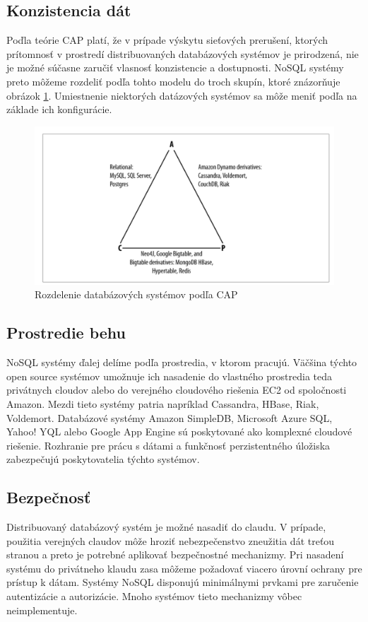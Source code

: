 \documentclass[11pt,twoside,a4paper]{book}
\begin{document}
\subsection{Konzistencia dát}
Poďla teórie CAP platí, že v prípade výskytu sieťových prerušení, ktorých prítomnosť v prostredí distribuovaných databázových systémov je prirodzená, nie je možné súčasne zaručiť vlasnosť konzistencie a dostupnosti. NoSQL systémy preto môžeme rozdeliť podľa tohto modelu do troch skupín, ktoré znázorňuje obrázok \ref{fig:scalling}. Umiestnenie niektorých datázových systémov sa môže meniť podľa na základe ich konfigurácie. 

\begin{figure}[h]
 \centering
 \includegraphics[width=13cm]{./figures/capDatabases.png}
 \caption{Rozdelenie databázových systémov podľa CAP}
 \label{fig:scalling}
\end{figure}


\subsection{Prostredie behu}
NoSQL systémy ďalej delíme  podľa prostredia, v ktorom pracujú. Väčšina týchto open source systémov umožnuje ich nasadenie do vlastného prostredia teda privátnych cloudov alebo do verejného cloudového riešenia EC2 od spoločnosti Amazon. Mezdi tieto systémy patria napríklad Cassandra, HBase, Riak, Voldemort. Databázové systémy Amazon SimpleDB, Microsoft Azure SQL, Yahoo! YQL alebo Google App Engine sú poskytované ako komplexné cloudové riešenie. Rozhranie pre prácu s dátami a funkčnosť perzistentného úložiska zabezpečujú poskytovatelia týchto systémov.



\subsection{Bezpečnosť}
Distribuovaný databázový systém je možné nasadiť do claudu. V prípade, použitia verejných claudov môže hroziť nebezpečenstvo zneužitia dát treťou stranou a preto je potrebné aplikovať bezpečnostné mechanizmy. Pri nasadení systému do privátneho klaudu zasa môžeme požadovať viacero úrovní ochrany pre prístup k dátam. Systémy NoSQL disponujú minimálnymi prvkami pre zaručenie autentizácie a autorizácie. Mnoho systémov tieto mechanizmy vôbec neimplementuje.
\end{document}
